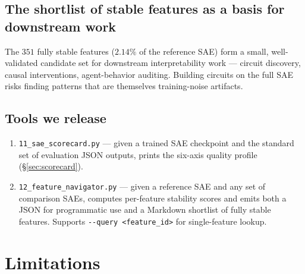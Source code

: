 \documentclass[11pt]{article}
\begin{document}
\subsection{The shortlist of stable features as a basis for downstream work}

The $351$ fully stable features ($2.14\%$ of the reference SAE) form a
small, well-validated candidate set for downstream interpretability
work --- circuit discovery, causal interventions, agent-behavior
auditing. Building circuits on the full SAE risks finding patterns that
are themselves training-noise artifacts.

\subsection{Tools we release}

\begin{enumerate}
\item \texttt{11\_sae\_scorecard.py} --- given a trained SAE checkpoint
and the standard set of evaluation JSON outputs, prints the six-axis
quality profile (\S\ref{sec:scorecard}).
\item \texttt{12\_feature\_navigator.py} --- given a reference SAE and
any set of comparison SAEs, computes per-feature stability scores and
emits both a JSON for programmatic use and a Markdown shortlist of
fully stable features. Supports \texttt{-{}-query <feature\_id>} for
single-feature lookup.
\end{enumerate}

\section{Limitations}
\end{document}
